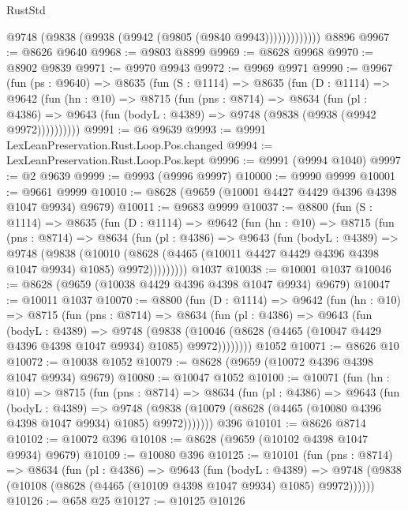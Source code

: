 \begin{lexlean}{RustStd}
\begin{coremodule}
                  @9748 (@9838 (@9938 (@9942 (@9805 (@9840 @9943)))))))))))))
    @8896
@9967 := @8626 @9640
@9968 := @9803 @8899
@9969 := @8628 @9968
@9970 := @8902 @9839
@9971 := @9970 @9943
@9972 := @9969 @9971
@9990 := @9967
    (fun (ps : @9640) =>
    @8635
      (fun (S : @1114) =>
      @8635
        (fun (D : @1114) =>
        @9642
          (fun (hn : @10) =>
          @8715
            (fun (pns : @8714) =>
            @8634
              (fun (pl : @4386) =>
              @9643 (fun (bodyL : @4389) => @9748 (@9838 (@9938 (@9942 @9972))))))))))
@9991 := @6 @9639
@9993 := @9991 LexLeanPreservation.Rust.Loop.Pos.changed
@9994 := LexLeanPreservation.Rust.Loop.Pos.kept
@9996 := @9991 (@9994 @1040)
@9997 := @2 @9639
@9999 := @9993 (@9996 @9997)
@10000 := @9990 @9999
@10001 := @9661 @9999
@10010 := @8628 (@9659 (@10001 @4427 @4429 @4396 @4398 @1047 @9934) @9679)
@10011 := @9683 @9999
@10037 := @8800
    (fun (S : @1114) =>
    @8635
      (fun (D : @1114) =>
      @9642
        (fun (hn : @10) =>
        @8715
          (fun (pns : @8714) =>
          @8634
            (fun (pl : @4386) =>
            @9643
              (fun (bodyL : @4389) =>
              @9748
                (@9838
                  (@10010
                    (@8628 (@4465 (@10011 @4427 @4429 @4396 @4398 @1047 @9934) @1085) @9972)))))))))
    @1037
@10038 := @10001 @1037
@10046 := @8628 (@9659 (@10038 @4429 @4396 @4398 @1047 @9934) @9679)
@10047 := @10011 @1037
@10070 := @8800
    (fun (D : @1114) =>
    @9642
      (fun (hn : @10) =>
      @8715
        (fun (pns : @8714) =>
        @8634
          (fun (pl : @4386) =>
          @9643
            (fun (bodyL : @4389) =>
            @9748
              (@9838
                (@10046 (@8628 (@4465 (@10047 @4429 @4396 @4398 @1047 @9934) @1085) @9972))))))))
    @1052
@10071 := @8626 @10
@10072 := @10038 @1052
@10079 := @8628 (@9659 (@10072 @4396 @4398 @1047 @9934) @9679)
@10080 := @10047 @1052
@10100 := @10071
    (fun (hn : @10) =>
    @8715
      (fun (pns : @8714) =>
      @8634
        (fun (pl : @4386) =>
        @9643
          (fun (bodyL : @4389) =>
          @9748 (@9838 (@10079 (@8628 (@4465 (@10080 @4396 @4398 @1047 @9934) @1085) @9972)))))))
    @396
@10101 := @8626 @8714
@10102 := @10072 @396
@10108 := @8628 (@9659 (@10102 @4398 @1047 @9934) @9679)
@10109 := @10080 @396
@10125 := @10101
    (fun (pns : @8714) =>
    @8634
      (fun (pl : @4386) =>
      @9643
        (fun (bodyL : @4389) =>
        @9748 (@9838 (@10108 (@8628 (@4465 (@10109 @4398 @1047 @9934) @1085) @9972))))))
@10126 := @658 @25
@10127 := @10125 @10126

\end{coremodule}
\end{lexlean}
